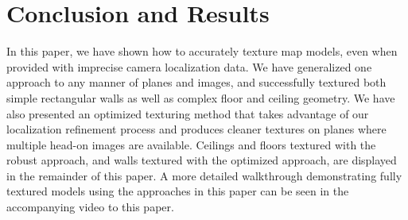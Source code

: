 \documentclass[10pt,twocolumn,letterpaper]{article}
\begin{document}
\section{Conclusion and Results}
In this paper, we have shown how to accurately texture map models,
even when provided with imprecise camera localization data. We have
generalized one approach to any manner of planes and images, and
successfully textured both simple rectangular walls as well as complex
floor and ceiling geometry. We have also presented an optimized
texturing method that takes advantage of our localization refinement
process and produces cleaner textures on planes where multiple head-on
images are available. Ceilings and floors textured with the robust
approach, and walls textured with the optimized approach, are
displayed in the remainder of this paper. A more detailed walkthrough
demonstrating fully textured models using the approaches in this paper
can be seen in the accompanying video to this paper.

{\small   }
\end{document}
